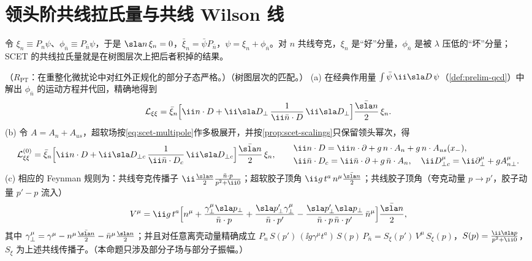 \section{领头阶共线拉氏量与共线 Wilson 线}\label{sec:scet-lagrangian}

令 $\xi_n\equiv P_n\psi$、$\phi_{\bar n}\equiv P_{\bar n}\psi$，于是 $\sla n\,\xi_n=0$，$\bar\xi_n=\bar\psi P_{\bar n}$，$\psi=\xi_n+\phi_{\bar n}$。对 $n$ 共线夸克，$\xi_n$ 是“好”分量，$\phi_{\bar n}$ 是被 $\lambda$ 压低的“坏”分量；SCET 的共线拉氏量就是在树图层次上把后者积掉的结果。

\begin{proposition}\label{prop:scet-lagrangian}
（$R_{\mathrm{PT}}$：在重整化微扰论中对红外正规化的部分子态严格。）（树图层次的匹配。）
(a) 在经典作用量 $\int\bar\psi\,\ii\sla D\,\psi$（\cref{def:prelim-qcd}）中解出 $\phi_{\bar n}$ 的运动方程并代回，精确地得到
\begin{equation}\label{eq:scet-Lxixi-exact}
\mathcal L_{\xi\xi}=\bar\xi_n\Big[\ii n\cdot D+\ii\sla D_\perp\,\frac{1}{\ii\bar n\cdot D}\,\ii\sla D_\perp\Big]\frac{\bar{\sla n}}{2}\,\xi_n .
\end{equation}
(b) 令 $A=A_n+A_{us}$，超软场按\cref{eq:scet-multipole}作多极展开，并按\cref{prop:scet-scalings}只保留领头幂次，得
\begin{equation}\label{eq:scet-L0xi}
\mathcal L^{(0)}_{\xi\xi}=\bar\xi_n\Big[\ii n\cdot D+\ii\sla D_{\perp c}\,\frac{1}{\ii\bar n\cdot D_c}\,\ii\sla D_{\perp c}\Big]\frac{\bar{\sla n}}{2}\,\xi_n,\qquad
\begin{aligned}
&\ii n\cdot D=\ii n\cdot\partial+g\,n\cdot A_n+g\,n\cdot A_{us}(x_-),\\
&\ii\bar n\cdot D_c=\ii\bar n\cdot\partial+g\,\bar n\cdot A_n,\quad \ii D^\mu_{\perp c}=\ii\partial^\mu_\perp+gA^\mu_{n\perp}.
\end{aligned}
\end{equation}
(c) 相应的 Feynman 规则为：共线夸克传播子 $\ii\frac{\sla n}{2}\frac{\bar n\cdot p}{p^2+\ii0}$；超软胶子顶角 $\ii g\,t^a\,n^\mu\frac{\bar{\sla n}}{2}$；共线胶子顶角（夸克动量 $p\to p'$，胶子动量 $p'-p$ 流入）
\begin{equation}\label{eq:scet-collvertex}
V^\mu=\ii g\,t^a\Big[n^\mu+\frac{\gamma_\perp^\mu\sla p_\perp}{\bar n\cdot p}+\frac{\sla p'_\perp\gamma_\perp^\mu}{\bar n\cdot p'}-\frac{\sla p'_\perp\sla p_\perp}{\bar n\cdot p\,\bar n\cdot p'}\,\bar n^\mu\Big]\frac{\bar{\sla n}}{2},
\end{equation}
其中 $\gamma_\perp^\mu=\gamma^\mu-n^\mu\frac{\bar{\sla n}}{2}-\bar n^\mu\frac{\sla n}{2}$；并且对任意离壳动量精确成立
$P_n\,S(p')\,(\ii g\gamma^\mu t^a)\,S(p)\,P_{\bar n}=S_\xi(p')\,V^\mu\,S_\xi(p)$，$S(p)=\frac{\ii\sla p}{p^2+\ii0}$，$S_\xi$ 为上述共线传播子。（本命题只涉及部分子场与部分子振幅。）
\end{proposition}

